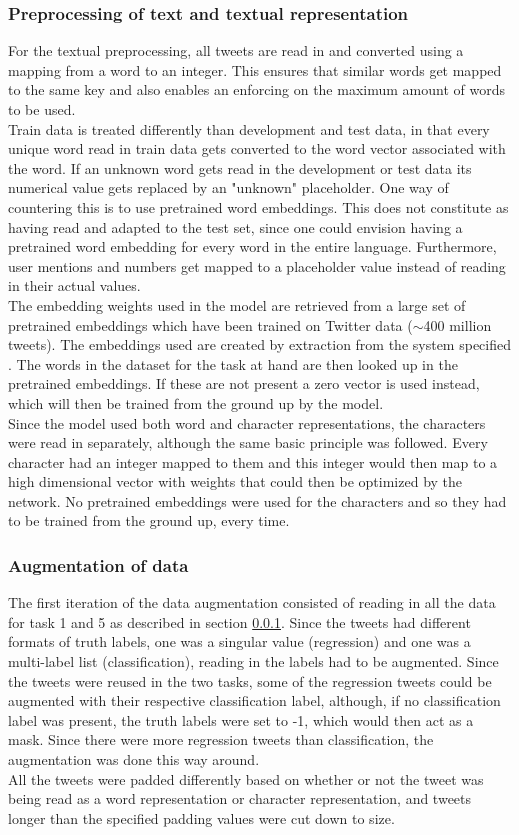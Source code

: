 \subsubsection{Preprocessing of text and textual representation} \label{sec:preprop}
For the textual preprocessing, all tweets are read in and converted using a mapping from a word to an integer. This ensures that similar words get mapped to the same key and also enables an enforcing on the maximum amount of words to be used.\\
Train data is treated differently than development and test data, in that every unique word read in train data gets converted to the word vector associated with the word. If an unknown word gets read in the development or test data its numerical value gets replaced by an "unknown" placeholder. One way of countering this is to use pretrained word embeddings. This does not constitute as having read and adapted to the test set, since one could envision having a pretrained word embedding for every word in the entire language. Furthermore, user mentions and numbers get mapped to a placeholder value instead of reading in their actual values.\\
The embedding weights used in the model are retrieved from a large set of pretrained embeddings which have been trained on Twitter data ($\sim$400 million tweets). The embeddings used are created by extraction from the system specified \cite{godin}. The words in the dataset for the task at hand are then looked up in the pretrained embeddings. If these are not present a zero vector is used instead, which will then be trained from the ground up by the model.\\
Since the model used both word and character representations, the characters were read in separately, although the same basic principle was followed. Every character had an integer mapped to them and this integer would then map to a high dimensional vector with weights that could then be optimized by the network. No pretrained embeddings were used for the characters and so they had to be trained from the ground up, every time.

\subsubsection{Augmentation of data} \label{sec:augm}
The first iteration of the data augmentation consisted of reading in all the data for task 1 and 5 as described in section \ref{sec:preprop}. Since the tweets had different formats of truth labels, one was a singular value (regression) and one was a multi-label list (classification), reading in the labels had to be augmented. Since the tweets were reused in the two tasks, some of the regression tweets could be augmented with their respective classification label, although, if no classification label was present, the truth labels were set to -1, which would then act as a mask. Since there were more regression tweets than classification, the augmentation was done this way around.\\
All the tweets were padded differently based on whether or not the tweet was being read as a word representation or character representation, and tweets longer than the specified padding values were cut down to size. 

